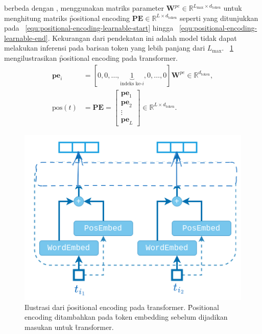 	berbeda dengan \cite{transformerori}, \cite{bertori} menggunakan matriks parameter $\mathbf{W}^{pe} \in \mathbb{R}^{L_{\max} \times d_{\text{token}}}$ untuk menghitung matriks \f{positional encoding} $\mathbf{PE} \in \mathbb{R}^{L \times d_{\text{token}}}$ seperti yang ditunjukkan pada \equ~\ref{equ:positional-encoding-learnable-start} hingga \equ~\ref{equ:positional-encoding-learnable-end}. Kekurangan dari pendekatan ini adalah model tidak dapat melakukan inferensi pada barisan token yang lebih panjang dari $L_{\max}$. \pic~\ref{fig:positional-encoding} mengilustrasikan \f{positional encoding} pada \f{transformer}.
	\begin{align}
		\label{equ:positional-encoding-learnable-start}
		\mathbf{pe}_{i} &= [0, 0,\dots, \underbrace{1}_{\text{indeks ke-}i},0, \dots, 0] \mathbf{W}^{pe} \in \mathbb{R}^{d_{\text{token}}}, \\
		\label{equ:positional-encoding-learnable-end}
		 \text{pos}(t) &= \mathbf{PE} = \begin{bmatrix}
			\mathbf{pe}_1 \\
			\mathbf{pe}_2 \\
			\vdots \\
			\mathbf{pe}_L
		\end{bmatrix} \in \mathbb{R}^{L \times d_{\text{token}}}.
	\end{align}
	\begin{figure}
		\centering
		\includegraphics[width=1\textwidth]{assets/pics/positional_encoding.png}
		\caption{Ilustrasi dari \f{positional encoding} pada \f{transformer}. \f{Positional encoding} ditambahkan pada \f{token embedding} sebelum dijadikan masukan untuk \f{transformer}.}
		\label{fig:positional-encoding}
	\end{figure}

